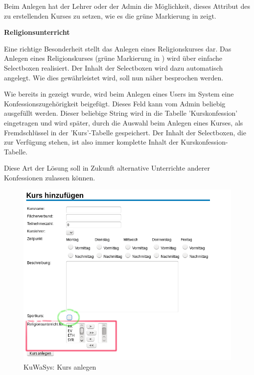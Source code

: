 Beim Anlegen hat der Lehrer oder der Admin die Möglichkeit, dieses Attribut des zu erstellenden Kurses zu setzen, wie es die grüne Markierung in  zeigt.


\textbf{Religionsunterricht}

Eine richtige Besonderheit stellt das Anlegen eines Religionskurses dar.
Das Anlegen eines Religionskurses (grüne Markierung in ) wird über einfache Selectboxen realisiert. Der Inhalt der Selectboxen wird dazu automatisch angelegt. Wie dies gewährleistet wird, soll nun näher besprochen werden.

Wie bereits in  gezeigt wurde, wird beim Anlegen eines Users im System eine Konfessionszugehörigkeit beigefügt. Dieses Feld kann vom Admin beliebig ausgefüllt werden. 
Dieser beliebige String wird in die Tabelle 'Kurskonfession' eingetragen und wird später, durch die Auswahl beim Anlegen eines Kurses, als Fremdschlüssel in der 'Kurs'-Tabelle gespeichert.
Der Inhalt der Selectboxen, die zur Verfügung stehen, ist also immer komplette Inhalt der Kurskonfession-Tabelle.

Diese Art der Lösung soll in Zukunft alternative Unterrichte anderer Konfessionen zulassen können.

\begin{figure}[H]
 \begin{center}
   \includegraphics[scale=0.6]{img/KursAnlegen_KuWaSys.png}
 \end{center}
 \caption[\textbf{KuWaSys: Kurs anlegen}]{KuWaSys: Kurs anlegen}
 \label{fig:KursAnlegen_KuWaSys}
\end{figure}


